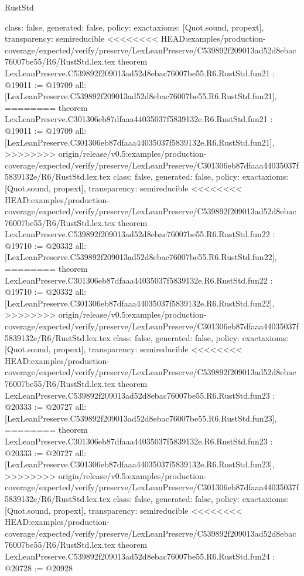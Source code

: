 \begin{lexlean}{RustStd}
\begin{coremodule}
{\begin{coremodule}
{{{{{{{{{{{{{{{{{{{{{{{{  class: false,
  generated: false,
  policy: exact{axioms: [Quot.sound, propext]},
  transparency: semireducible
}
<<<<<<<< HEAD:examples/production-coverage/expected/verify/preserve/LexLeanPreserve/C539892f209013ad52d8ebac76007be55/R6/RustStd.lex.tex
theorem LexLeanPreserve.C539892f209013ad52d8ebac76007be55.R6.RustStd.fun21 : @19011 := @19709 {
  all: [LexLeanPreserve.C539892f209013ad52d8ebac76007be55.R6.RustStd.fun21],
========
theorem LexLeanPreserve.C301306eb87dfaaa44035037f5839132e.R6.RustStd.fun21 : @19011 := @19709 {
  all: [LexLeanPreserve.C301306eb87dfaaa44035037f5839132e.R6.RustStd.fun21],
>>>>>>>> origin/release/v0.5:examples/production-coverage/expected/verify/preserve/LexLeanPreserve/C301306eb87dfaaa44035037f5839132e/R6/RustStd.lex.tex
  class: false,
  generated: false,
  policy: exact{axioms: [Quot.sound, propext]},
  transparency: semireducible
}
<<<<<<<< HEAD:examples/production-coverage/expected/verify/preserve/LexLeanPreserve/C539892f209013ad52d8ebac76007be55/R6/RustStd.lex.tex
theorem LexLeanPreserve.C539892f209013ad52d8ebac76007be55.R6.RustStd.fun22 : @19710 := @20332 {
  all: [LexLeanPreserve.C539892f209013ad52d8ebac76007be55.R6.RustStd.fun22],
========
theorem LexLeanPreserve.C301306eb87dfaaa44035037f5839132e.R6.RustStd.fun22 : @19710 := @20332 {
  all: [LexLeanPreserve.C301306eb87dfaaa44035037f5839132e.R6.RustStd.fun22],
>>>>>>>> origin/release/v0.5:examples/production-coverage/expected/verify/preserve/LexLeanPreserve/C301306eb87dfaaa44035037f5839132e/R6/RustStd.lex.tex
  class: false,
  generated: false,
  policy: exact{axioms: [Quot.sound, propext]},
  transparency: semireducible
}
<<<<<<<< HEAD:examples/production-coverage/expected/verify/preserve/LexLeanPreserve/C539892f209013ad52d8ebac76007be55/R6/RustStd.lex.tex
theorem LexLeanPreserve.C539892f209013ad52d8ebac76007be55.R6.RustStd.fun23 : @20333 := @20727 {
  all: [LexLeanPreserve.C539892f209013ad52d8ebac76007be55.R6.RustStd.fun23],
========
theorem LexLeanPreserve.C301306eb87dfaaa44035037f5839132e.R6.RustStd.fun23 : @20333 := @20727 {
  all: [LexLeanPreserve.C301306eb87dfaaa44035037f5839132e.R6.RustStd.fun23],
>>>>>>>> origin/release/v0.5:examples/production-coverage/expected/verify/preserve/LexLeanPreserve/C301306eb87dfaaa44035037f5839132e/R6/RustStd.lex.tex
  class: false,
  generated: false,
  policy: exact{axioms: [Quot.sound, propext]},
  transparency: semireducible
}
<<<<<<<< HEAD:examples/production-coverage/expected/verify/preserve/LexLeanPreserve/C539892f209013ad52d8ebac76007be55/R6/RustStd.lex.tex
theorem LexLeanPreserve.C539892f209013ad52d8ebac76007be55.R6.RustStd.fun24 : @20728 := @20928 {
}}}}}}}}}}}}}}}}}}}}}}}}}}}
\end{coremodule}}
\end{coremodule}
\end{lexlean}
